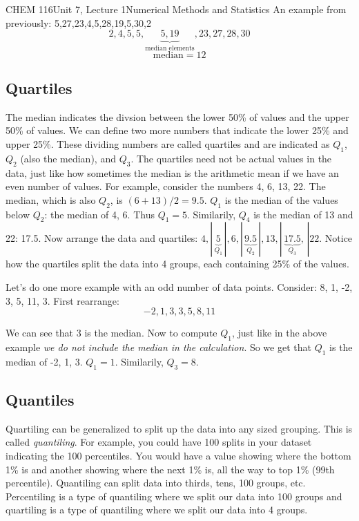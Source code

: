 \documentclass{article}
\begin{document}
\begin{tdoc}{CHEM 116}{Unit 7, Lecture 1}{Numerical Methods and Statistics}
An example from previously: 5,27,23,4,5,28,19,5,30,2
\[
2,4,5,5,\underbrace{5,19}_{\textrm{median elements}},23,27,28,30
\]
\[
\textrm{median} = 12
\]

\subsection{Quartiles}

The median indicates the divsion between the lower 50\% of values and the upper 50\% of values. We can define two more numbers that indicate the lower 25\% and upper 25\%. These dividing numbers are called quartiles and are indicated as $Q_1$, $Q_2$ (also the median), and $Q_3$. The quartiles need not be actual values in the data, just like how sometimes the median is the arithmetic mean if we have an even number of values. For example, consider the numbers 4, 6, 13, 22. The median, which is also $Q_2$, is $(6 + 13) / 2 = 9.5$. $Q_1$ is the median of the values below $Q_2$: the median of 4, 6. Thus $Q_1 = 5$. Similarily, $Q_4$ is the median of 13 and 22: 17.5. Now arrange the data and quartiles: $ 4, |\,\underbrace{5}_{Q_1}\,|, 6, |\,\underbrace{9.5}_{Q_2}\,|, 13, |\,\underbrace{17.5}_{Q_3},\,| 22$. Notice how the quartiles split the data into 4 groups, each containing 25\% of the values.

Let's do one more example with an odd number of data points. Consider: 8, 1, -2, 3, 5, 11, 3. First rearrange:
\[
-2, 1, 3, 3, 5, 8, 11
\]

We can see that $3$ is the median. Now to compute $Q_1$, just like in the above example \textit{we do not include the median in the calculation}. So we get that $Q_1$ is the median of -2, 1, 3. $Q_1 = 1$. Similarily, $Q_3 = 8$.

\subsection{Quantiles}

Quartiling can be generalized to split up the data into any sized grouping. This is called \textit{quantiling}. For example, you could have 100 splits in your dataset indicating the 100 percentiles. You would have a value showing where the bottom 1\% is and another showing where the next 1\% is, all the way to top 1\% (99th percentile). Quantiling can split data into thirds, tens, 100 groups, etc. Percentiling is a type of quantiling where we split our data into 100 groups and quartiling is a type of quantiling where we split our data into 4 groups.

\end{tdoc}
\end{document}
